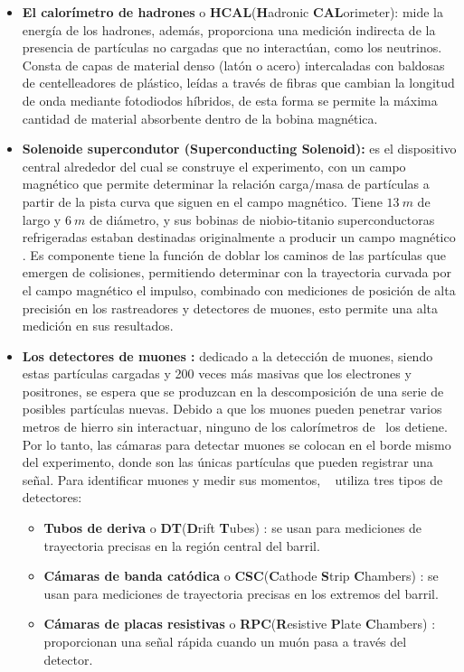 \begin{itemize}
\item \textbf{El calorímetro de hadrones} o \textbf{HCAL}(\textbf{H}adronic \textbf{CAL}orimeter): mide la energía de los hadrones, además, proporciona una medición indirecta de la presencia de partículas no cargadas que no interactúan, como los neutrinos. Consta de capas de material denso (latón o acero) intercaladas con baldosas de centelleadores de plástico, leídas a través de fibras que cambian la longitud de onda mediante fotodiodos híbridos, de esta forma se permite la máxima cantidad de material absorbente dentro de la bobina magnética.

\item \textbf{Solenoide supercondutor (Superconducting Solenoid):} es el dispositivo central alrededor del cual se construye el experimento, con un campo magnético que %
permite determinar la relación carga/masa de partículas a partir de la pista curva que siguen en el campo magnético. Tiene $13~m$ de largo y $6~m$ de diámetro, y sus bobinas de niobio-titanio superconductoras refrigeradas estaban destinadas originalmente a producir un campo magnético %
. Es componente tiene la función de doblar los caminos de las partículas que emergen de colisiones, permitiendo determinar con la trayectoria curvada por el campo magnético el impulso, combinado con mediciones de posición de alta precisión en los rastreadores y detectores de muones, esto permite una alta medición en sus resultados.

\item \textbf{Los detectores de muones :} dedicado a la detección de muones, siendo estas partículas cargadas y 200 veces más masivas que los electrones y positrones, se espera que se produzcan en la descomposición de una serie de posibles partículas nuevas. Debido a que los muones pueden penetrar varios metros de hierro sin interactuar, ninguno de los calorímetros de \CMS ~los detiene. Por lo tanto, las cámaras para detectar muones se colocan en el borde mismo del experimento, donde son las únicas partículas que pueden registrar una señal. Para identificar muones y medir sus momentos, \CMS ~ utiliza tres tipos de detectores: 
\begin{itemize}
\item \textbf{Tubos de deriva} o \textbf{DT}(\textbf{D}rift \textbf{T}ubes) : se usan para mediciones de trayectoria precisas en la región central del barril.
\item \textbf{Cámaras de banda catódica} o \textbf{CSC}(\textbf{C}athode \textbf{S}trip \textbf{C}hambers) : se usan para mediciones de trayectoria precisas en los extremos del barril. 
\item \textbf{Cámaras de placas resistivas} o \textbf{RPC}(\textbf{R}esistive \textbf{P}late \textbf{C}hambers) : proporcionan una señal rápida cuando un muón pasa a través del detector.
\end{itemize}

\end{itemize}




